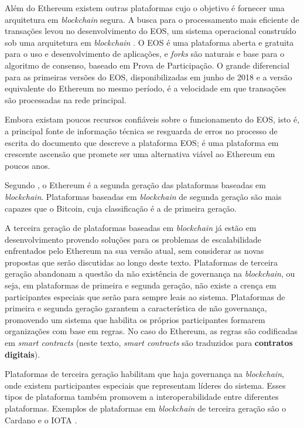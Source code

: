 \documentclass[tcc,capa]{texufpel}
\begin{document}
    Além do Ethereum existem outras plataformas cujo o objetivo é fornecer uma arquitetura em \textit{blockchain} segura. A busca para o processamento mais eficiente de transações levou no desenvolvimento do EOS, um sistema operacional construído sob uma arquitetura em \textit{blockchain} \cite{eos2018}. O EOS é uma plataforma aberta e gratuita para o uso e desenvolvimento de aplicações, e \textit{forks} são naturais e base para o algoritmo de consenso, baseado em Prova de Participação. O grande diferencial para as primeiras versões do EOS, disponibilizadas em junho de 2018 e a versão equivalente do Ethereum no mesmo período, é a velocidade em que transações são processadas na rede principal.
    
    Embora existam poucos recursos confiáveis sobre o funcionamento do EOS, isto é, a principal fonte de informação técnica se resguarda de erros no processo de escrita do documento que descreve a plataforma EOS; é uma plataforma em crescente ascensão que promete ser uma alternativa viável ao Ethereum em poucos anos.
    
    Segundo \cite{spurjeonsurvey}, o Ethereum é a segunda geração das plataformas baseadas em \textit{blockchain}. Plataformas baseadas em \textit{blockchain} de segunda geração são mais capazes que o Bitcoin, cuja classificação é a de primeira geração. 
    
    A terceira geração de plataformas baseadas em \textit{blockchain} já estão em desenvolvimento provendo soluções para os problemas de escalabilidade enfrentados pelo Ethereum na sua versão atual, sem considerar as novas propostas que serão discutidas ao longo deste texto. Plataformas de terceira geração abandonam a questão da não existência de governança na \textit{blockchain}, ou seja, em plataformas de primeira e segunda geração, não existe a crença em participantes especiais que serão para sempre leais ao sistema. Plataformas de primeira e segunda geração garantem a característica de não governança, promovendo um sistema que habilita os próprios participantes formarem organizações com base em regras. No caso do Ethereum, as regras são codificadas em \textit{smart contracts} (neste texto, \textit{smart contracts} são traduzidos para \textbf{contratos digitais}).
    
    Plataformas de terceira geração habilitam que haja governança na \textit{blockchain}, onde existem participantes especiais que representam líderes do sistema. Esses tipos de plataforma também promovem a interoperabilidade entre diferentes plataformas. Exemplos de plataformas em \textit{blockchain} de terceira geração são o Cardano e o IOTA \cite{spurjeonsurvey}.
    
\end{document}
